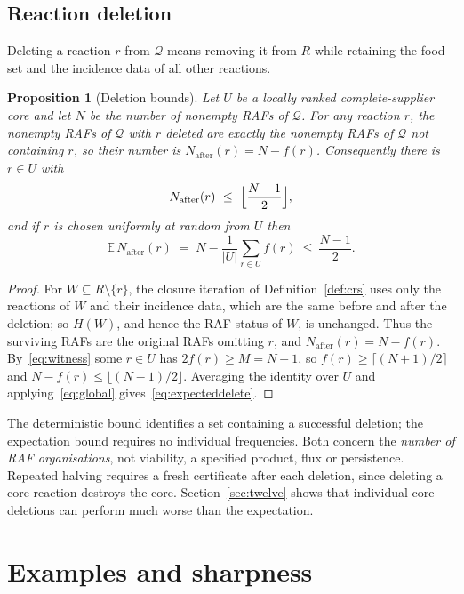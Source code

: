\documentclass[11pt,a4paper]{article}
\theoremstyle{plain}
\newtheorem{proposition}[theorem]{Proposition}
\theoremstyle{definition}
\theoremstyle{remark}
\newcommand{\QQ}{\mathcal Q}
\newcommand{\E}{\mathbb E}
\newcommand{\after}{\mathrm{after}}
\begin{document}
\subsection{Reaction deletion}

Deleting a reaction $r$ from $\QQ$ means removing it from $R$ while retaining the food set and the incidence data of all other reactions.

\begin{proposition}[Deletion bounds]\label{prop:delete}
Let $U$ be a locally ranked complete-supplier core and let $N$ be the number of nonempty RAFs of $\QQ$. For any reaction $r$, the nonempty RAFs of $\QQ$ with $r$ deleted are exactly the nonempty RAFs of $\QQ$ not containing $r$, so their number is $N_\after(r)=N-f(r)$. Consequently there is $r\in U$ with
\begin{equation}\label{eq:delete}
 N_\after(r)\ \le\ \Bigl\lfloor\frac{N-1}2\Bigr\rfloor ,
\end{equation}
and if $r$ is chosen uniformly at random from $U$ then
\begin{equation}\label{eq:expecteddelete}
 \E\,N_\after(r)\;=\;N-\frac1{|U|}\sum_{r\in U}f(r)\ \le\ \frac{N-1}2 .
\end{equation}
\end{proposition}
\begin{proof}
For $W\subseteq R\setminus\{r\}$, the closure iteration of Definition~\ref{def:crs} uses only the reactions of $W$ and their incidence data, which are the same before and after the deletion; so $H(W)$, and hence the RAF status of $W$, is unchanged. Thus the surviving RAFs are the original RAFs omitting $r$, and $N_\after(r)=N-f(r)$. By~\eqref{eq:witness} some $r\in U$ has $2f(r)\ge M=N+1$, so $f(r)\ge\lceil(N+1)/2\rceil$ and $N-f(r)\le\lfloor(N-1)/2\rfloor$. Averaging the identity over $U$ and applying~\eqref{eq:global} gives~\eqref{eq:expecteddelete}.
\end{proof}

The deterministic bound identifies a set containing a successful deletion; the expectation bound requires no individual frequencies. Both concern the \emph{number of RAF organisations}, not viability, a specified product, flux or persistence. Repeated halving requires a fresh certificate after each deletion, since deleting a core reaction destroys the core. Section~\ref{sec:twelve} shows that individual core deletions can perform much worse than the expectation.

\section{Examples and sharpness}\label{sec:examples}
\end{document}
